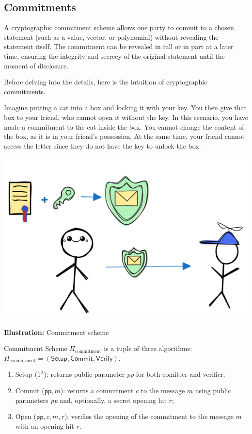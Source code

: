 \documentclass[../lecture-notes.tex]{subfiles}
\begin{document}
\subsection{Commitments}

\begin{definition}
    A cryptographic commitment scheme allows one party to commit to a chosen statement (such as a value, vector, or polynomial) without revealing the statement itself. The commitment can be revealed in full or in part at a later time, ensuring the integrity and secrecy of the original statement until the moment of disclosure.
\end{definition}

Before delving into the details, here is the intuition of cryptographic commitments.

Imagine putting a cat into a box and locking it with your key. 
You then give that box to your friend, who cannot open it without the key.
In this scenario, you have made a commitment to the cat inside the box. 
You cannot change the content of the box, as it is in your friend's possession. 
At the same time, your friend cannot access the letter since they do not have the key to unlock the box.

\begin{center}
    \centering\includegraphics[width=0.5\linewidth, clip]{images/lecture_5/CommitmentExample.png}

    \scriptsize{\textbf{Illustration:} Commitment scheme}
\end{center}

\begin{definition}
    
    Commitment Scheme $\Pi_{\text{commitment}}$ is a tuple of three algorithms: $\Pi_{\text{commitment}} = (\mathsf{Setup}, \mathsf{Commit}, \mathsf{Verify})$.

    \begin{enumerate}

        \item Setup ($1^{\lambda}$): returns public parameter \textit{pp} for both comitter and verifier;

        \item  Commit ($\mathsf{pp}, m$): returns a commitment $c$ to the message $m$ using public parameters \textit{pp} and, optionally, a secret opening hit $r$;

        \item  Open ($\mathsf{pp}, c, m, r$): verifies the opening of the commitment to the message $m$ with an opening hit $r$. 
    \end{enumerate}
\end{definition}
\end{document}
